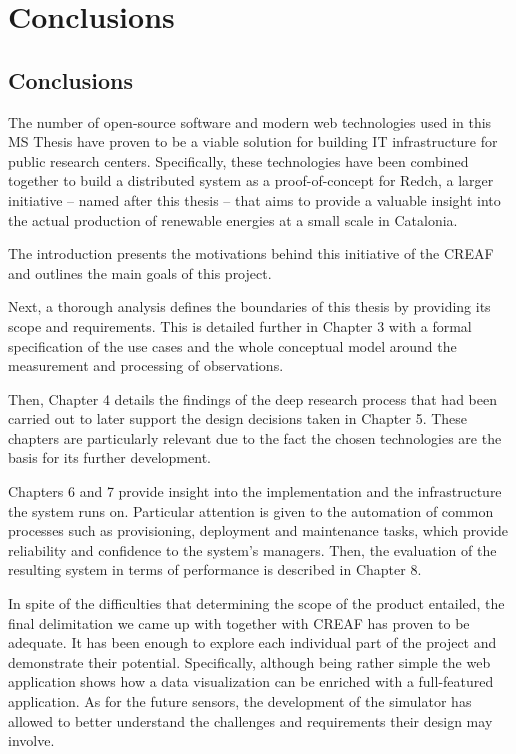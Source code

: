 \chapter{Conclusions}

\section{Conclusions}

The number of open-source software and modern web technologies used in this MS Thesis have proven to be a viable solution for building IT infrastructure for public research centers. Specifically, these technologies have been combined together to build a distributed system as a proof-of-concept for Redch, a larger initiative -- named after this thesis -- that aims to provide a valuable insight into the actual production of renewable energies at a small scale in Catalonia.

The introduction presents the motivations behind this initiative of the CREAF and outlines the main goals of this project.

Next, a thorough analysis defines the boundaries of this thesis by providing its scope and requirements. This is detailed further in Chapter 3 with a formal specification of the use cases and the whole conceptual model around the measurement and processing of observations.

Then, Chapter 4 details the findings of the deep research process that had been carried out 
to later support the design decisions taken in Chapter 5. These chapters are particularly relevant due to the fact the chosen technologies are the basis for its further development.

Chapters 6 and 7 provide insight into the implementation and the infrastructure the system runs on. Particular attention is given to the automation of common processes such as provisioning, deployment and maintenance tasks, which provide reliability and confidence to the system's managers. Then, the evaluation of the resulting system in terms of performance is described in Chapter 8.

In spite of the difficulties that determining the scope of the product entailed, the final delimitation we came up with together with CREAF has proven to be adequate. It has been enough to explore each individual part of the project and demonstrate their potential. Specifically, although being rather simple the web application shows how a data visualization can be enriched with a full-featured application. As for the future sensors, the development of the simulator has allowed to better understand the challenges and requirements their design may involve.


